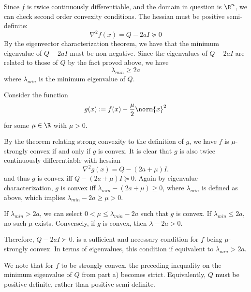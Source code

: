 \documentclass{homework}
\begin{document}
\begin{letterenum}
    \item Since $f$ is twice continuously differentiable, and the
        domain in question is $\R^n$, we can check second order
        convexity conditions. The hessian must be positive semi-definite:
        \begin{equation}
            \nabla^2 f(x) = Q - 2aI \succeq 0
        \end{equation}
        By the eigenvector characterization theorem, we have that the minimum
        eigenvalue of $Q - 2aI$ must be non-negative. Since the eigenvalues
        of $Q-2aI$ are related to those of $Q$ by the fact proved above, we have
        \begin{equation}
            \lambda_{min} \geq 2a
        \end{equation}
        where $\lambda_{min}$ is the minimum eigenvalue of $Q$.

    \item Consider the function
    \begin{equation}
        g(x) := f(x) - \frac{\mu}{2}\norm{x}^2
    \end{equation}
    for some $\mu\in\R$ with $\mu > 0$.
    
    By the theorem relating strong convexity to the definition of
    $g$, we have $f$ is $\mu$-strongly convex if and only if $g$
    is convex. It is clear that $g$ is also twice continuously
    differentiable with hessian
    \begin{equation}
        \nabla^2 g(x) = Q - (2a + \mu) I.
    \end{equation}
    and thus $g$ is convex iff $Q - (2a + \mu)I \succeq 0$. Again by eigenvalue
    characterization, $g$ is convex iff $\lambda_{min} - (2a + \mu) \geq 0$,
    where $\lambda_{min}$ is defined as above, which implies
    $\lambda_{min} - 2a \geq \mu > 0$.

    If $\lambda_{min} > 2a$, we can select
    $0 < \mu \leq \lambda_{min} - 2a$ such that $g$ is convex.
    If $\lambda_{min} \leq 2a$, no such $\mu$ exists.
    Conversely, if $g$ is convex, then $\lambda - 2a > 0$.

    Therefore, $Q - 2aI \succ 0$. 
    is a sufficient and necessary condition for $f$ being
    $\mu$-strongly convex. In terms of eigenvalues, this condition
    if equivalent to $\lambda_{min} > 2a$.

    We note that for $f$ to be strongly convex, the preceding
    inequality on the minimum eigenvalue of $Q$ from part a) becomes strict. Equivalently,
    $Q$ must be positive definite, rather than positive semi-definite.
\end{letterenum}
\end{document}
